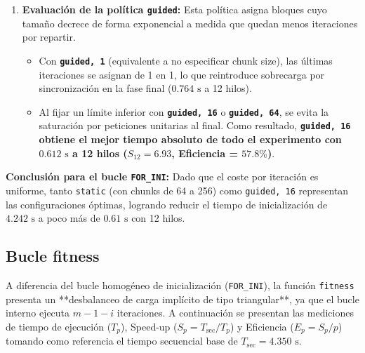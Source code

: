 \documentclass[12pt]{article}
\begin{document}
\begin{enumerate}
\begin{enumerate}
    \item \textbf{Evaluación de la política \texttt{guided}:}
    Esta política asigna bloques cuyo tamaño decrece de forma exponencial a medida que quedan menos iteraciones por repartir.
    \begin{itemize}
        \item Con \textbf{\texttt{guided, 1}} (equivalente a no especificar chunk size), las últimas iteraciones se asignan de 1 en 1, lo que reintroduce sobrecarga por sincronización en la fase final ($0.764\text{ s}$ a 12 hilos).
        \item Al fijar un límite inferior con \textbf{\texttt{guided, 16}} o \textbf{\texttt{guided, 64}}, se evita la saturación por peticiones unitarias al final. Como resultado, \textbf{\texttt{guided, 16} obtiene el mejor tiempo absoluto de todo el experimento con $0.612\text{ s}$ a 12 hilos ($S_{12} = 6.93$, Eficiencia = $57.8\%$)}.
    \end{itemize}
\end{enumerate}

\textbf{Conclusión para el bucle \texttt{FOR\_INI}:}  
Dado que el coste por iteración es uniforme, tanto \texttt{static} (con chunks de 64 a 256) como \texttt{guided, 16} representan las configuraciones óptimas, logrando reducir el tiempo de inicialización de $4.242\text{ s}$ a poco más de $0.61\text{ s}$ con 12 hilos.



\subsection*{Bucle fitness} 

A diferencia del bucle homogéneo de inicialización (\texttt{FOR\_INI}), la función \texttt{fitness} presenta un **desbalanceo de carga implícito de tipo triangular**, ya que el bucle interno ejecuta $m - 1 - i$ iteraciones. A continuación se presentan las mediciones de tiempo de ejecución ($T_p$), Speed-up ($S_p = T_{\text{sec}} / T_p$) y Eficiencia ($E_p = S_p / p$) tomando como referencia el tiempo secuencial base de $T_{\text{sec}} = 4.350\text{ s}$.


\end{enumerate}
\end{document}
